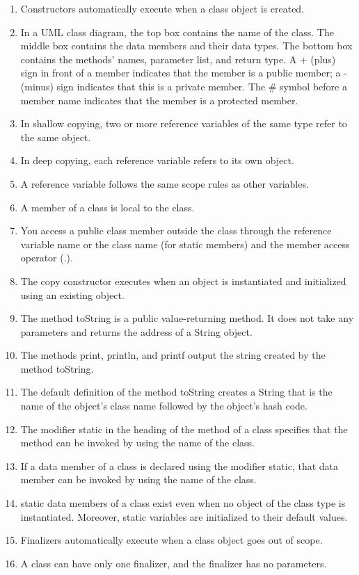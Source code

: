 \documentclass[12pt,a4paper,final,twoside,onecolumn,titlepage]{book}
\begin{document}
\begin{enumerate}
\item Constructors automatically execute when a class object is created.
\item In a UML class diagram, the top box contains the name of the class. The middle box contains the data members and their data types. The bottom box contains the methods’ names, parameter list, and return type. A + (plus) sign in front of a member indicates that the member is a public member; a - (minus) sign indicates that this is a private member. The \# symbol before a member name indicates that the member is a protected member.
\item In shallow copying, two or more reference variables of the same type refer to the same object.
\item In deep copying, each reference variable refers to its own object.
\item A reference variable follows the same scope rules as other variables.
\item A member of a class is local to the class.
\item You access a public class member outside the class through the reference variable name or the class name (for static members) and the member access operator (.).
\item The copy constructor executes when an object is instantiated and initialized using an existing object.
\item The method toString is a public value-returning method. It does not take any parameters and returns the address of a String object.
\item The methods print, println, and printf output the string created by the method toString.
\item The default definition of the method toString creates a String that is the name of the object’s class name followed by the object’s hash code.
\item The modifier static in the heading of the method of a class specifies that the method can be invoked by using the name of the class.
\item If a data member of a class is declared using the modifier static, that data member can be invoked by using the name of the class.
\item static data members of a class exist even when no object of the class type is instantiated. Moreover, static variables are initialized to their default values.
\item Finalizers automatically execute when a class object goes out of scope.
\item A class can have only one finalizer, and the finalizer has no parameters.

\end{enumerate}
\end{document}
